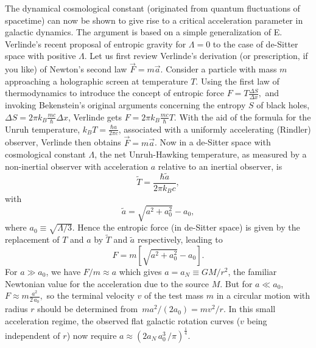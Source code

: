 \documentclass[a4paper]{jpconf}
\begin{document}
The dynamical cosmological constant (originated from quantum fluctuations of 
spacetime) can now be
shown to give rise to a critical acceleration
parameter in galactic dynamics.  The argument \cite{HMN} is based on
a simple generalization of E. Verlinde's recent proposal of entropic gravity 
\cite{verlinde,Jacob95} for $\Lambda = 0$ to the case of de-Sitter space 
with positive $\Lambda$.  Let us first review Verlinde's derivation (or
prescription, if you like) of Newton's second law $\vec{F} = m \vec{a}$.  
Consider a particle with mass $m$ approaching a holographic screen
at temperature $T$.  Using the first law of thermodynamics to introduce the 
concept of entropic force
$
F = T \frac{\Delta S}{\Delta x},
$
and invoking Bekenstein's original arguments \cite{bekenstein}
concerning the entropy $S$ of black holes,
$\Delta S = 2\pi k_B \frac{mc}{\hbar} \Delta x$,
Verlinde gets $ F = 2\pi k_B \frac{mc}{\hbar} T$.  With the aid of
the formula for the Unruh temperature, $k_B T = \frac{\hbar a}{2 \pi c}$,
associated with a uniformly accelerating (Rindler) observer, Verlinde
then obtains $\vec{F} = m \vec{a}$.
Now in a de-Sitter space with cosmological 
constant $\Lambda$, the net Unruh-Hawking temperature, 
\cite{unruh,Davies,hawking} as measured by a non-inertial observer with 
acceleration $a$ relative to an inertial observer, is 
\begin{equation}
\tilde{T} = \frac{\hbar \tilde{a}}{2\pi k_B c}, 
\end{equation}
with \cite{deser}
\begin{equation}
\tilde{a} = \sqrt{a^2+a_0^2} - a_0, 
\end{equation}
where $a_0 \equiv \sqrt{\Lambda / 3}$.  Hence the
entropic force (in de-Sitter space) is given by the replacement of $T$ and 
$a$ by  $\tilde{T}$ and $\tilde{a}$ respectively, leading to
\begin{equation}
F =  m [\sqrt{a^2+a_0^2}-a_0].
\end{equation}
For $ a \gg a_0$, we have $F/m \approx a$ which gives $a = a_N \equiv GM/r^2$, 
the familiar Newtonian value for the acceleration due to the source $M$. But for 
$a \ll a_0$, $F \approx m \frac{a^2}{2\,a_0},$ so
the terminal velocity $v$ of the test mass $m$ in a circular motion with radius 
$r$ should be determined from
\,$ m a^2/(2a_0) = m v^2/r$.  In this small acceleration regime,
the observed flat galactic rotation curves ($v$ being independent of $r$) now 
require
$ a \approx \left(2  a_N \,a_0^3 \,/ \pi \right)^{\frac14}$.
\end{document}
